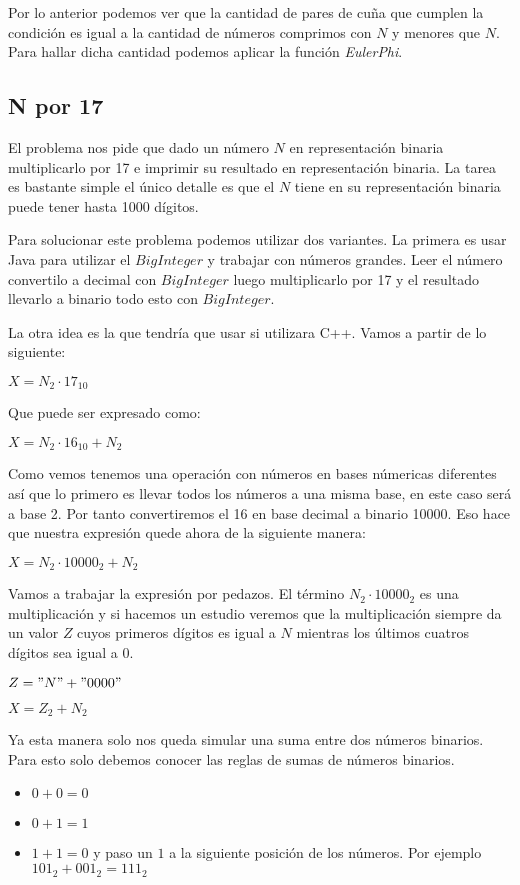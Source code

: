 Por lo anterior podemos ver que la cantidad de pares de cuña que cumplen la condición es igual a la cantidad de números comprimos con $N$ y menores que $N$. Para hallar dicha cantidad podemos aplicar la función \emph{EulerPhi}.

\subsection{N por 17} El problema nos pide que dado un número $N$ en representación binaria multiplicarlo por 17 e imprimir su resultado en representación binaria. La tarea es bastante simple el único detalle es que el $N$ tiene en su representación binaria puede tener hasta 1000 dígitos. 

Para solucionar este problema podemos utilizar dos variantes. La primera es usar Java para utilizar el $BigInteger$ y trabajar con números grandes. Leer el número convertilo a decimal con $BigInteger$ luego multiplicarlo por 17 y el resultado llevarlo a binario todo esto con $BigInteger$.

La otra idea es la que tendría que usar si utilizara C++. Vamos a partir de lo siguiente:

$ X=N_{2} \cdot 17_{10} $

Que puede ser expresado como:

$ X=N_{2} \cdot 16_{10} + N_{2} $

Como vemos tenemos una operación con números en bases númericas diferentes así que lo primero es llevar todos los números a una misma base, en este caso será a base 2. Por tanto convertiremos el 16 en base decimal a binario 10000. Eso hace que nuestra expresión quede ahora de la siguiente manera:

$ X=N_{2} \cdot 10000_{2} + N_{2} $

Vamos a trabajar la expresión por pedazos. El término $N_{2} \cdot 10000_{2}$ es una multiplicación y si hacemos un estudio veremos que la multiplicación siempre da un valor $Z$ cuyos primeros dígitos es igual a $N$ mientras los últimos cuatros dígitos sea igual a $0$.

$Z = "N"+"0000" $


$ X=Z_{2} + N_{2} $

Ya esta manera solo nos queda simular una suma entre dos números binarios. Para esto solo debemos conocer las reglas de sumas de números binarios.

\begin{itemize}
	\item $0+0=0$
	\item $0+1=1$
	\item $1+1=0$ y paso un $1$ a la siguiente posición de los números. Por ejemplo $101_{2} +001_{2}=111_{2} $
\end{itemize}

